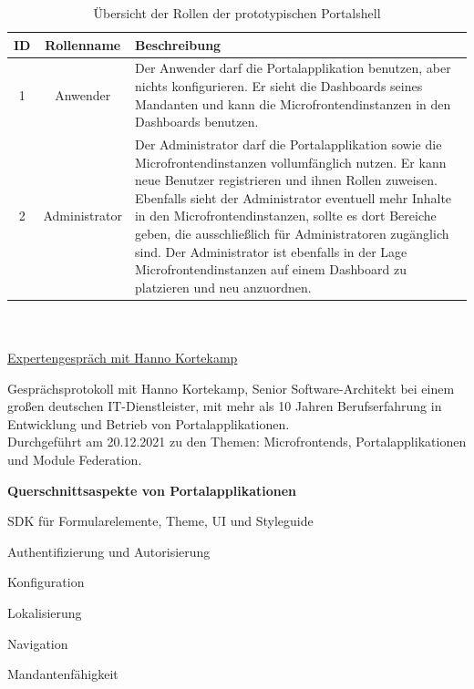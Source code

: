 \begin{table}[hbt]
	\centering
	\begin{minipage}[t]{\textwidth} %
		\caption{Übersicht der Rollen der prototypischen Portalshell} %
		\begin{tabularx}{\columnwidth}{|c|c|X|}
			\toprule
			ID & Rollenname 		& Beschreibung \\
			\midrule
			1 & Anwender 				& Der Anwender darf die Portalapplikation benutzen, aber nichts konfigurieren. Er sieht die Dashboards seines Mandanten und kann die Microfrontendinstanzen in den Dashboards benutzen.\\
			\midrule
			2 & Administrator 			& Der Administrator darf die Portalapplikation sowie die Microfrontendinstanzen vollumfänglich nutzen. Er kann neue Benutzer registrieren und ihnen Rollen zuweisen. Ebenfalls sieht der Administrator eventuell mehr Inhalte in den Microfrontendinstanzen, sollte es dort Bereiche geben, die ausschließlich für Administratoren zugänglich sind. Der Administrator ist ebenfalls in der Lage Microfrontendinstanzen auf einem Dashboard zu platzieren und neu anzuordnen.\\
			\bottomrule
		\end{tabularx}
		\label{tab:RollenPortalapplikation}
	\end{minipage}
\end{table}

\newpage
{}\label{app:Expertengespräche}
\\ \\
\underline{Expertengespräch mit Hanno Kortekamp}

Gesprächsprotokoll mit Hanno Kortekamp, Senior Software-Architekt bei einem großen deutschen IT-Dienstleister, mit mehr als 10 Jahren Berufserfahrung in Entwicklung und Betrieb von Portalapplikationen.\\
Durchgeführt am 20.12.2021 zu den Themen: Microfrontends, Portalapplikationen und Module Federation.

\textbf{Querschnittsaspekte von Portalapplikationen} 
\begin{compactitem}
   \item SDK für Formularelemente, Theme, UI und Styleguide
   \item Authentifizierung und Autorisierung
   \item Konfiguration
   \item Lokalisierung
   \item Navigation
   \item Mandantenfähigkeit
\end{compactitem}

